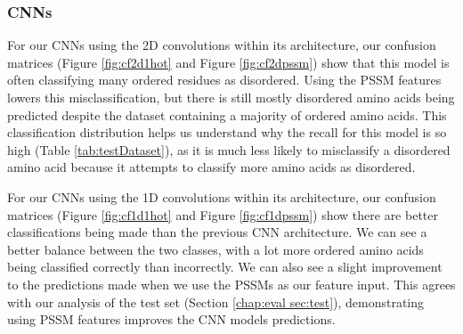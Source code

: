 \documentclass{l4proj}
\begin{document}
\subsubsection{CNNs \newline}
For our CNNs using the 2D convolutions within its architecture, our confusion matrices (Figure \ref{fig:cf2d1hot} and Figure \ref{fig:cf2dpssm}) show that this model is often classifying many ordered residues as disordered. Using the PSSM features lowers this misclassification, but there is still mostly disordered amino acids being predicted despite the dataset containing a majority of ordered amino acids. This classification distribution helps us understand why the recall for this model is so high (Table \ref{tab:testDataset}), as it is much less likely to misclassify a disordered amino acid because it attempts to classify more amino acids as disordered.

For our CNNs using the 1D convolutions within its architecture, our confusion matrices (Figure \ref{fig:cf1d1hot} and Figure \ref{fig:cf1dpssm}) show there are better classifications being made than the previous CNN architecture. We can see a better balance between the two classes, with a lot more ordered amino acids being classified correctly than incorrectly. We can also see a slight improvement to the predictions made when we use the PSSMs as our feature input. This agrees with our analysis of the test set (Section \ref{chap:eval sec:test}), demonstrating using PSSM features improves the CNN models predictions.
\end{document}
